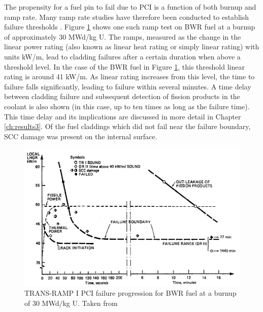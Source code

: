 The propensity for a fuel pin to fail due to PCI is a function of both burnup and ramp rate. Many ramp rate studies have therefore been conducted to establish failure thresholds \cite{Thomas1979, mogard1980studsvik, franklin1985performance, mogard1985international, djurle1984super, howe1991ramp, baba1983power, suzuki1994bumup, wesley1994mark, djurle1983studsvik, hollowell1982international}. Figure \ref{figure:BWRrampthreshold} shows one such ramp test on BWR fuel at a burnup of approximately 30 MWd/kg U. The ramps, measured as the change in the linear power rating (also known as linear heat rating or simply linear rating) with units kW/m, lead to cladding failures after a certain duration when above a threshold level. In the case of the BWR fuel in Figure \ref{figure:BWRrampthreshold}, this threshold linear rating is around 41 kW/m. As linear rating increases from this level, the time to failure falls significantly, leading to failure within several minutes. A time delay between cladding failure and subsequent detection of fission products in the coolant is also shown (in this case, up to ten times as long as the failure time). This time delay and its implications are discussed in more detail in Chapter \ref{ch:results3}. Of the fuel claddings which did not fail near the failure boundary, SCC damage was present on the internal surface. 

\begin{figure}[ht] %
\centering
\includegraphics[width=14cm]{images/BWRrampthreshold.png}
\caption[TRANS-RAMP I PCI failure progression for BWR fuel at a burnup of 30 MWd/kg U.]{TRANS-RAMP I PCI failure progression for BWR fuel at a burnup of 30 MWd/kg U. Taken from \cite{Mogard1988}}
\label{figure:BWRrampthreshold}
\end{figure}

